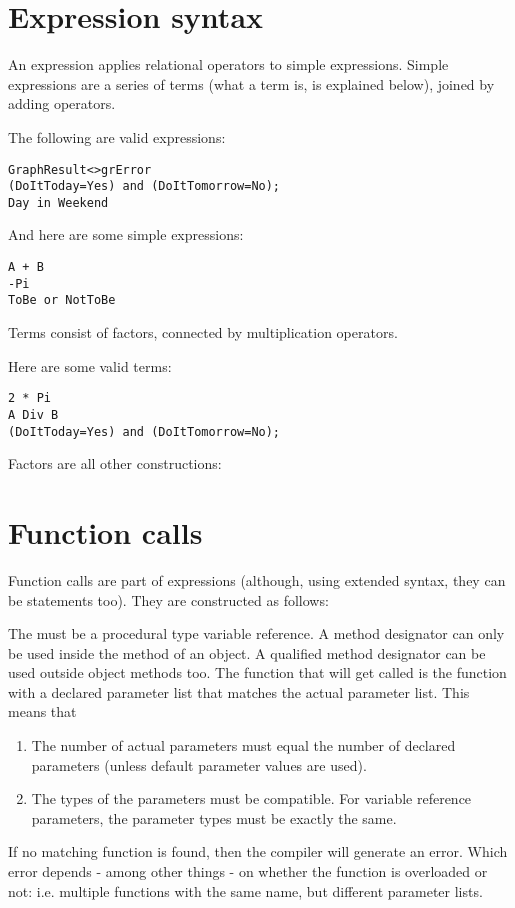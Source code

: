 \section{Expression syntax}
An expression applies relational operators to simple expressions. Simple
expressions are a series of terms (what a term is, is explained below), joined by
adding operators.

The following are valid expressions:
\begin{verbatim}
GraphResult<>grError
(DoItToday=Yes) and (DoItTomorrow=No);
Day in Weekend
\end{verbatim}
And here are some simple expressions:
\begin{verbatim}
A + B
-Pi
ToBe or NotToBe
\end{verbatim}
Terms consist of factors, connected by multiplication operators.

Here are some valid terms:
\begin{verbatim}
2 * Pi
A Div B
(DoItToday=Yes) and (DoItTomorrow=No);
\end{verbatim}
Factors are all other constructions:


\section{Function calls}
Function calls are part of expressions (although, using extended syntax,
they can be statements too). They are constructed as follows:

The  must be a procedural type variable reference.
A method designator can only be used inside the method of an object. A
qualified method designator can be used outside object methods too.
The function that will get called is the function with a declared parameter
list that matches the actual parameter list. This means that
\begin{enumerate}
\item The number of actual parameters must equal the number of declared
parameters (unless default parameter values are used).
\item The types of the parameters must be compatible. For variable
reference parameters, the parameter types must be exactly the same.
\end{enumerate}
If no matching function is found, then the compiler will generate an error.
Which error depends - among other things - on whether the function is overloaded
or not: i.e. multiple functions with the same name, but different parameter
lists.

